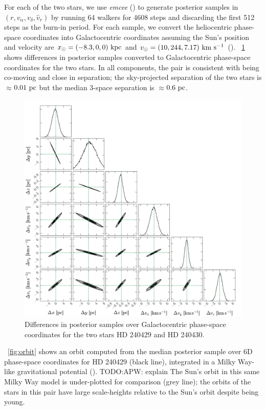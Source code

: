 \documentclass[manuscript]{aastex6}
\newcommand{\project}[1]{\textsl{#1}}
\newcommand{\kms}{\ensuremath{\rm km~s^{-1}}}
\newcommand{\pc}{{\rm pc}}
\newcommand{\todo}[1]{{\color{blue}TODO:#1}}
\begin{document}
For each of the two stars, we use \project{emcee}
(\citealt{Foreman-Mackey:2013}) to generate posterior samples in $(r, v_\alpha,
v_\delta, \hat{v}_r)$ by running 64 walkers for 4608 steps and discarding the
first 512 steps as the burn-in period.
For each sample, we convert the heliocentric phase-space coordinates into
Galactocentric coordinates assuming the Sun's position and velocity are $x_\odot
= (-8.3, 0, 0)~{\rm kpc}$ and $v_\odot = (10, 244, 7.17)~\kms$ (\citealt{bovy,
etc.}).
\figurename~\ref{fig:dxdv} shows differences in posterior samples converted to
Galactocentric phase-space coordinates for the two stars.
In all components, the pair is consistent with being co-moving and close in
separation; the sky-projected separation of the two stars is $\approx$$0.01~\pc$
but the median 3-space separation is $\approx$$0.6~\pc$.

\begin{figure}[htbp]
  \begin{center}
    \includegraphics[width=\linewidth]{dx_dv_posterior.pdf}
  \end{center}
  \caption{%
    Differences in posterior samples over Galactocentric phase-space coordinates
    for the two stars HD 240429 and HD 240430.
    \label{fig:dxdv}}
\end{figure}

\figurename~\ref{fig:orbit} shows an orbit computed from the median posterior
sample over 6D phase-space coordinates for HD 240429 (black line), integrated
in a Milky Way-like gravitational potential (\cite{Gala:2017}). \todo{APW:
explain}
The Sun's orbit in this same Milky Way model is under-plotted for comparison
(grey line); the orbits of the stars in this pair have large scale-heights
relative to the Sun's orbit despite being young.
\end{document}
